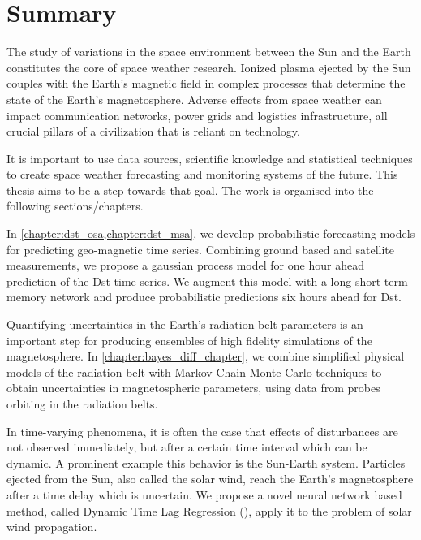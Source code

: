 \chapter*{Summary}\label{chapter:abstract}

\begin{center}

    \textbf{\doctitle}

    \textit{\docsubtitle}


\end{center}

The study of variations in the space environment between the Sun and the Earth constitutes 
the core of space weather research. Ionized plasma ejected by the Sun couples with the Earth’s 
magnetic field in complex processes that determine the state of the Earth's magnetosphere. Adverse 
effects from space weather can impact communication networks, power grids and logistics 
infrastructure, all crucial pillars of a civilization that is reliant on technology.

It is important to use data sources, scientific knowledge and statistical techniques to create 
space weather forecasting and monitoring systems of the future. This thesis aims to be a step 
towards that goal. The work is organised into the following sections/chapters.

In \cref{chapter:dst_osa,chapter:dst_msa}, we develop probabilistic forecasting models for 
predicting geo-magnetic time series. Combining ground based and satellite measurements, we propose 
a gaussian process model for one hour ahead prediction of the Dst time series. We augment this 
model with a long short-term memory network and produce probabilistic predictions six hours ahead 
for Dst.

Quantifying uncertainties in the Earth's radiation belt parameters is an important step for 
producing ensembles of high fidelity simulations of the magnetosphere. In 
\cref{chapter:bayes_diff_chapter}, we combine simplified physical models of the radiation belt with 
Markov Chain Monte Carlo techniques to obtain uncertainties in magnetospheric parameters, using 
data from probes orbiting in the radiation belts.

In time-varying phenomena, it is often the case that effects of disturbances are not observed 
immediately, but after a certain time interval which can be dynamic. A prominent example this 
behavior is the Sun-Earth system. Particles ejected from the Sun, also called the solar wind, reach 
the Earth's magnetosphere after a time delay which is uncertain. We propose a novel neural network 
based method, called Dynamic Time Lag Regression (\XX), apply it to the problem of solar wind 
propagation.
